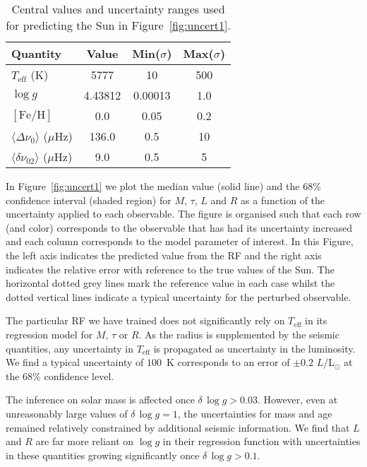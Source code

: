  
 \begin{table}
 \centering
    \caption{Central values and uncertainty ranges used for predicting the Sun in Figure~\ref{fig:uncert1}.}
    \begin{tabular}{lccc}
    \hline \hline
Quantity & Value & Min($\sigma$) & Max($\sigma$) \\ \hline 
$T_{\text{eff}}$ (K)  & 5777 & 10  & 500\\
$\log{} g$ &  4.43812 & 0.00013 & 1.0\\
$[\text{Fe/H}]$ & 0.0 & 0.05 & 0.2 \\
%
$\langle\Delta\nu_0\rangle$ ($\mu$Hz) & 136.0 & 0.5 & 10\\
$\langle\delta\nu_{02}\rangle$ ($\mu$Hz)& 9.0 & 0.5 & 5 \\
\hline
    \end{tabular}
    \label{tab:sun}
\end{table}

 
In Figure~\ref{fig:uncert1} we plot the median value (solid line) and the $68\%$  confidence interval (shaded region)
 for $M$, $\tau$, $L$ and $R$ as a function of the uncertainty applied to each observable. The figure is organised such that each row (and color) corresponds to the observable that has had its uncertainty increased and each column corresponds to the model parameter of interest. In this Figure, the left axis indicates the predicted value from the RF and the right axis indicates the relative error with reference to the true values of the Sun.  The horizontal dotted grey lines mark the reference value in each case whilst the dotted vertical lines indicate a typical uncertainty for the perturbed observable. 

The particular RF we have trained does not significantly rely on $T_{\text{eff}}$ in its regression model for $M$, $\tau$ or $R$. As the radius is supplemented by the seismic quantities, any uncertainty in $T_{\text{eff}}$ is propagated as uncertainty in the luminosity. We find a typical uncertainty of $100$~K corresponds to an error of ${\pm 0.2}$ $L$/L$_{\odot}$ at the $68\%$ confidence level.

The inference on solar mass is affected once ${\delta \, \log{} g > 0.03}$. 
However, even at unreasonably large values of  ${\delta \, \log{} g = 1}$, the uncertainties for mass and age remained relatively constrained by additional seismic information. We find 
that $L$ and $R$ are far more reliant on ${\log{} g}$ in their regression function with uncertainties in these quantities growing significantly once  ${\delta \, \log{} g > 0.1}$.

